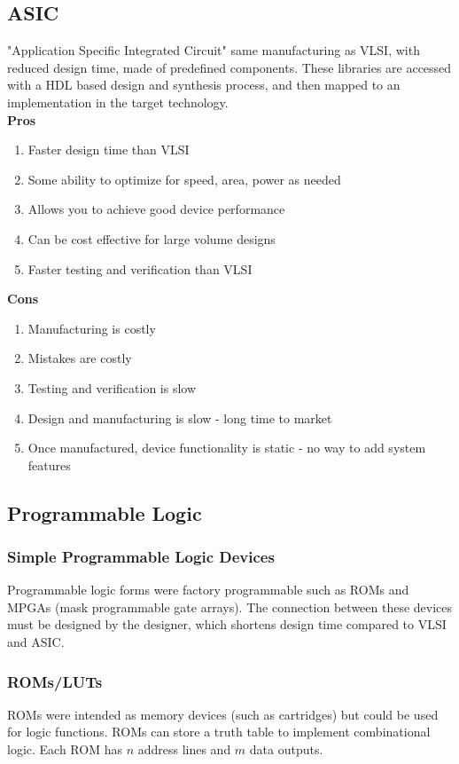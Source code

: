 \documentclass[11pt]{article}
\begin{document}
    \subsection{ASIC}
    "Application Specific Integrated Circuit" same manufacturing as VLSI, with reduced design time, made of predefined components. These libraries are accessed with a HDL based design and synthesis process, and then mapped to an implementation in the target technology. \\ 
    \textbf{Pros}
    \begin{enumerate}
        \item Faster design time than VLSI
        \item Some ability to optimize for speed, area, power as needed
        \item Allows you to achieve good device performance
        \item Can be cost effective for large volume designs
        \item Faster testing and verification than VLSI
    \end{enumerate}
    \textbf{Cons}
    \begin{enumerate}
        \item Manufacturing is costly
        \item Mistakes are costly
        \item Testing and verification is slow
        \item Design and manufacturing is slow - long time to market
        \item Once manufactured, device functionality is static - no way to add system features
    \end{enumerate}

    \subsection{Programmable Logic}
    \subsubsection{Simple Programmable Logic Devices}
    Programmable logic forms were factory programmable such as ROMs and MPGAs (mask programmable gate arrays). The connection between these devices must be designed by the designer, which shortens design time compared to VLSI and ASIC.
    \subsubsection{ROMs/LUTs}
    ROMs were intended as memory devices (such as cartridges) but could be used for logic functions. ROMs can store a truth table to implement combinational logic. Each ROM has $n$ address lines and $m$ data outputs.
\end{document}
